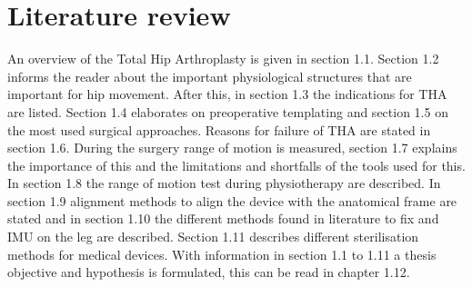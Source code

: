 \documentclass[whitelogo]{tudelft-report}
\begin{document}
% 
{\chapter{Literature review}
An overview of the Total Hip Arthroplasty is given in section 1.1. Section 1.2 informs the reader about the important physiological structures that are important for hip movement. After this, in section 1.3 the indications for THA are listed. Section 1.4 elaborates on preoperative templating and section 1.5 on the most used surgical approaches. Reasons for failure of THA are stated in section 1.6. During the surgery range of motion is measured, section 1.7 explains the importance of this and the limitations and shortfalls of the tools used for this. In section 1.8 the range of motion test during physiotherapy are described. In section 1.9 alignment methods to align the device with the anatomical frame are stated and in section 1.10 the different methods found in literature to fix and IMU on the leg are described. Section 1.11 describes different sterilisation methods for medical devices. With information in section 1.1 to 1.11 a thesis objective and hypothesis is formulated, this can be read in chapter 1.12.

}
\end{document}
